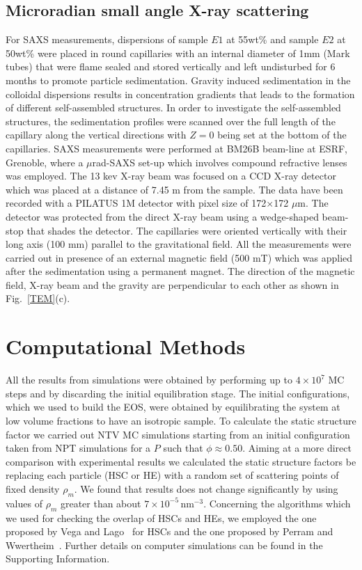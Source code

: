 \documentclass[aps,prl,preprint,superscriptaddress]{revtex4-1} %
\def\nm{\,\si{\nano\meter}}%
\begin{document}
\subsection{Microradian small angle X-ray scattering}
For SAXS measurements, dispersions of sample $E1$ at 55wt\% and sample $E2$ at 50wt\% were placed in round capillaries with an internal diameter of 1mm (Mark tubes) that were flame sealed and stored vertically and left undisturbed for 6 months to promote particle sedimentation. Gravity induced sedimentation in the colloidal dispersions results in concentration gradients that leads to the formation of different self-assembled structures. In order to investigate the self-assembled structures, the sedimentation profiles were scanned over the full length of the capillary along the vertical directions with $Z=0$ being set at the bottom of the capillaries. SAXS measurements were performed at BM26B beam-line at ESRF, Grenoble, where a $\mu$rad-SAXS set-up which involves compound refractive lenses~\cite{petukhov2015particle} was employed. The 13 kev X-ray beam was focused on a CCD X-ray detector which was placed at a distance of 7.45 m from the sample. The data have been recorded with a PILATUS 1M detector with pixel size of 172$\times$172 $\mu$m. The detector was protected from the direct X-ray beam using a wedge-shaped beam-stop that shades the detector. The capillaries were oriented vertically with their long axis (100 mm) parallel to the gravitational field. All the measurements were carried out in presence of an external magnetic field (500 mT) which was applied after the sedimentation using a permanent magnet. The direction of the magnetic field, X-ray beam and the gravity are perpendicular to each other as shown in Fig.~\ref{TEM}(c).
\section{Computational Methods}
All the results from simulations were obtained by performing up to $4\times10^7$ MC steps and by discarding the initial equilibration stage.
The initial configurations, which we used to build the EOS, were obtained by equilibrating the system at low volume fractions to have an isotropic
sample. To calculate the static structure factor we carried out NTV MC simulations starting from an initial configuration taken 
from NPT simulations for a $P$ such that $\phi\approx 0.50$. Aiming at a more direct comparison with experimental results we calculated
the static structure factors be replacing each particle (HSC or HE) with a random set of scattering points of fixed density $\rho_m$. We found
that results does not change significantly by using values of $\rho_m$ greater than about $7\times 10^{-5} \nm^{-3}$.%
Concerning the algorithms which we used for checking the overlap of HSCs and HEs, we employed the one proposed by Vega and Lago~\cite{VegaHSC1994} for HSCs and
the one proposed by Perram and Wwertheim~\cite{PerramJCP1985}. Further details on computer simulations can be found in the Supporting Information.
\end{document}
